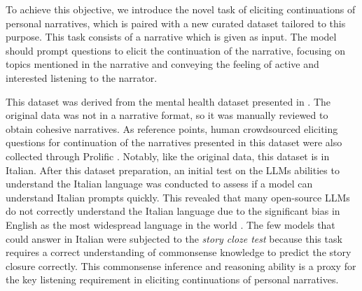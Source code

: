 To achieve this objective, we introduce the novel task of eliciting continuations of personal narratives, which is paired with a new curated dataset tailored to this purpose. This task consists of a narrative which is given as input. The model should prompt questions to elicit the continuation of the narrative, focusing on topics mentioned in the narrative and conveying the feeling of active and interested listening to the narrator.

This dataset was derived from the mental health dataset presented in \cite{coadapt}. The original data was not in a narrative format, so it was manually reviewed to obtain cohesive narratives. As reference points, human crowdsourced eliciting questions for continuation of the narratives presented in this dataset were also collected through Prolific \cite{prolific}. Notably, like the original data, this dataset is in Italian. After this dataset preparation, an initial test on the LLMs abilities to understand the Italian language was conducted to assess if a model can understand Italian prompts quickly. This revealed that many open-source LLMs do not correctly understand the Italian language due to the significant bias in English as the most widespread language in the world \cite{spanish-speakers}. The few models that could answer in Italian were subjected to the \emph{story cloze test} \cite{mostafazadeh2016corpus} because this task requires a correct understanding of commonsense knowledge to predict the story closure correctly. This commonsense inference and reasoning ability is a proxy for the key listening requirement in eliciting continuations of personal narratives. 

